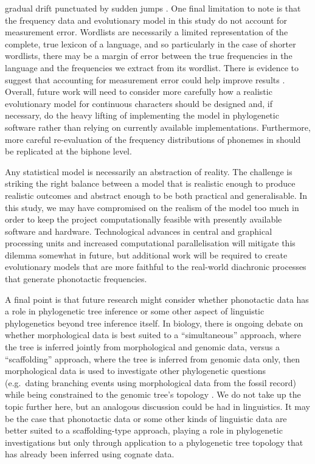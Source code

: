 \documentclass[]{article}
\begin{document}
gradual drift punctuated by sudden jumps \autocite{uyeda_rethinking_2018}. One final limitation to note is that the frequency data and evolutionary model in this study do not account for measurement error. Wordlists are necessarily a limited representation of the complete, true lexicon of a language, and so particularly in the case of shorter wordlists, there may be a margin of error between the true frequencies in the language and the frequencies we extract from its wordlist. There is evidence to suggest that accounting for measurement error could help improve results \autocite{round_clouded_2019}. Overall, future work will need to consider more carefully how a realistic evolutionary model for continuous characters should be designed and, if necessary, do the heavy lifting of implementing the model in phylogenetic software rather than relying on currently available implementations. Furthermore, more careful re-evaluation of the frequency distributions of phonemes in \textcite{macklin-cordes_re-evaluating_2020} should be replicated at the biphone level.

Any statistical model is necessarily an abstraction of reality. The challenge is striking the right balance between a model that is realistic enough to produce realistic outcomes and abstract enough to be both practical and generalisable. In this study, we may have compromised on the realism of the model too much in order to keep the project computationally feasible with presently available software and hardware. Technological advances in central and graphical processing units and increased computational parallelisation \autocite[e.g.][]{holbrook_massive_2020} will mitigate this dilemma somewhat in future, but additional work will be required to create evolutionary models that are more faithful to the real-world diachronic processes that generate phonotactic frequencies.

A final point is that future research might consider whether phonotactic data has a role in phylogenetic tree inference or some other aspect of linguistic phylogenetics beyond tree inference itself. In biology, there is ongoing debate on whether morphological data is best suited to a ``simultaneous'' approach, where the tree is inferred jointly from morphological and genomic data, versus a ``scaffolding'' approach, where the tree is inferred from genomic data only, then morphological data is used to investigate other phylogenetic questions (e.g.~dating branching events using morphological data from the fossil record) while being constrained to the genomic tree's topology \autocites{de_queiroz_including_1996}{lee_morphological_2015}. We do not take up the topic further here, but an analogous discussion could be had in linguistics. It may be the case that phonotactic data or some other kinds of linguistic data are better suited to a scaffolding-type approach, playing a role in phylogenetic investigations but only through application to a phylogenetic tree topology that has already been inferred using cognate data.
\end{document}
